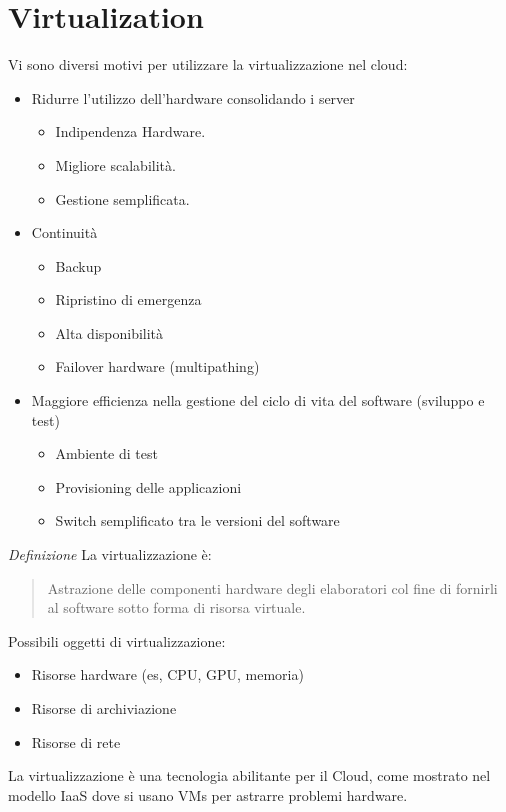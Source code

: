 \documentclass{article}
\begin{document}
		\section{Virtualization}
		Vi sono diversi motivi per utilizzare la virtualizzazione nel cloud:
		\begin{itemize}
		    \item Ridurre l'utilizzo dell'hardware consolidando i server
		    \begin{itemize}
		        \item Indipendenza Hardware.
		        \item Migliore scalabilità.
		        \item Gestione semplificata.
		    \end{itemize}
		    \item Continuità
		    \begin{itemize}
		        \item Backup
		        \item Ripristino di emergenza
		        \item Alta disponibilità
		        \item Failover hardware (multipathing)
		    \end{itemize}
		    \item Maggiore efficienza nella gestione del ciclo di vita del software (sviluppo e test)
		    \begin{itemize}
		        \item Ambiente di test
		        \item Provisioning delle applicazioni
		        \item Switch semplificato tra le versioni del software
		    \end{itemize}
		\end{itemize}
		
		\emph{Definizione} La virtualizzazione è: 
		\begin{quote}
			Astrazione delle componenti hardware degli elaboratori col fine di fornirli al software sotto forma di risorsa virtuale.
		\end{quote}
		Possibili oggetti di virtualizzazione:
		\begin{itemize}
		    \item Risorse hardware (es, CPU, GPU, memoria)
		    \item Risorse di archiviazione 
		    \item Risorse di rete
		\end{itemize}
		La virtualizzazione è una tecnologia abilitante per il Cloud, come mostrato nel modello IaaS dove si usano VMs per astrarre problemi hardware.\\
		
\end{document}
